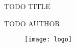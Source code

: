 \begin{titlepage}

\null\vfill

\begin{center}
\LARGE{TODO TITLE}
\end{center}

\vspace{1.5cm}

\begin{center}
TODO AUTHOR
\end{center}

\vfill

\begin{figure}[!b]
\centering
\texttt{[image: logo]}
\end{figure}

\vspace{2.0cm}

\end{titlepage}

